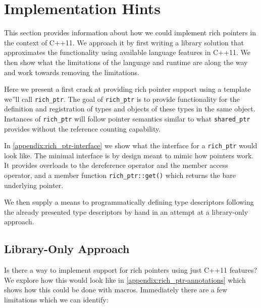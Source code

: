 \section{Implementation Hints}

This section provides information about how we could implement rich pointers
in the context of C++11. We approach it by first writing a library solution
that approximates the functionality using available language features in
C++11. We then show what the limitations of the language and runtime are along
the way and work towards removing the limitations.

Here we present a first crack at providing rich pointer support using a
template we''ll call \verb+rich_ptr+. The goal of \verb+rich_ptr+ is to
provide functionality for the definition and registration of types and objects
of these types in the same object. Instances of \verb+rich_ptr+ will follow
pointer semantics similar to what \verb+shared_ptr+ provides without the
reference counting capability.

In \autoref{appendix:rich_ptr-interface} we show what the interface for a
\verb+rich_ptr+ would look like. The minimal interface is by design meant to
mimic how pointers work. It provides overloads to the dereference operator and
the member access operator, and a member function \verb+rich_ptr::get()+ which
returns the bare underlying pointer.

We then supply a means to programmatically defining type descriptors following
the already presented type descriptors by hand in an attempt at a library-only
approach.

\subsection{Library-Only Approach}

Is there a way to implement support for rich pointers using just C++11
features? We explore how this would look like in
\autoref{appendix:rich_ptr-annotations} which shows how this could be done
with macros. Immediately there are a few limitations which we can identify:


